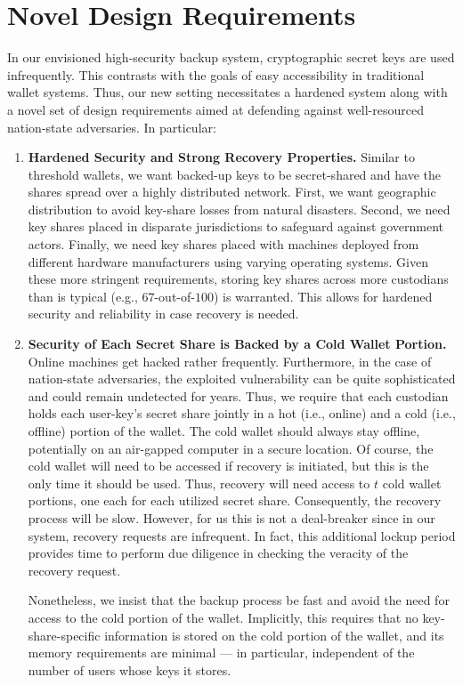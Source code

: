 \section{Novel Design Requirements}\label{sec:reqs}
In our envisioned high-security backup system, cryptographic secret keys are used infrequently. This contrasts with the goals of easy accessibility in traditional wallet systems. Thus, our new setting necessitates a hardened system along with a novel set of design requirements aimed at defending against well-resourced nation-state adversaries. In particular: 
\begin{enumerate}
\item \textbf{Hardened Security and Strong Recovery Properties.} Similar to threshold wallets, we want backed-up keys to be secret-shared and have the shares spread over a highly distributed network. First, we want geographic distribution to avoid key-share losses from natural disasters. Second, we need key shares placed in disparate jurisdictions to safeguard against government actors. Finally, we need key shares placed with machines deployed from different hardware manufacturers using varying operating systems. Given these more stringent requirements, storing key shares across more custodians than is typical (e.g., $67$-out-of-$100$) is warranted. This allows for hardened security and reliability in case recovery is needed.

\item \textbf{Security of Each Secret Share is Backed by a Cold Wallet Portion.} Online machines get hacked rather frequently. Furthermore, in the case of nation-state adversaries, the exploited vulnerability can be quite sophisticated and could remain undetected for years. Thus, we require that each custodian holds each user-key's secret share jointly in a hot (i.e., online) and a cold (i.e., offline) portion of the wallet. The cold wallet should always stay offline, potentially on an air-gapped computer in a secure location. Of course, the cold wallet will need to be accessed if recovery is initiated, but this is the only time it should be used. Thus, recovery will need access to $t$ cold wallet portions, one each for each utilized secret share. Consequently, the recovery process will be slow. However, for us this is not a deal-breaker since in our system, recovery requests are infrequent. In fact, this additional lockup period provides time to perform due diligence in checking the veracity of the recovery request. 

Nonetheless, we insist that the backup process be fast and avoid the need for access to the cold portion of the wallet. Implicitly, this requires that no key-share-specific information is stored on the cold portion of the wallet, and its memory requirements are minimal --- in particular, independent of the number of users whose keys it stores. 


\end{enumerate}
